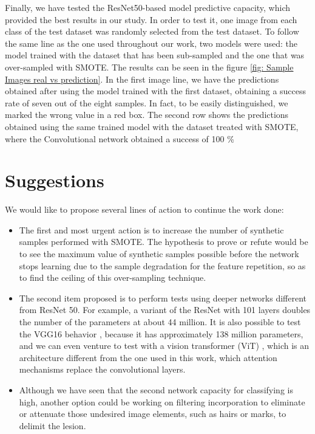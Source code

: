 Finally, we have tested the ResNet50-based model predictive capacity, which provided the best results in our study. In order to test it, one image from each class of the test dataset was randomly selected from the test dataset. To follow the same line as the one used throughout our work, two models were used: the model trained with the dataset that has been sub-sampled and the one that was over-sampled with SMOTE. The results can be seen in the figure \ref{fig: Sample Images real vs prediction}. In the first image line, we have the predictions obtained after using the model trained with the first dataset, obtaining a success rate of seven out of the eight samples. In fact, to be easily distinguished, we marked the wrong value in a red box. The second row shows the predictions obtained using the same trained model with the dataset treated with SMOTE, where the Convolutional network obtained a success of 100 \%

\section{Suggestions}

We would like to propose several lines of action to continue the work done:
\begin{itemize}
    \item The first and most urgent action is to increase the number of synthetic samples performed with SMOTE. The hypothesis to prove or refute would be to see the maximum value of synthetic samples possible before the network stops learning due to the sample degradation for the feature repetition, so as to find the ceiling of this over-sampling technique.
    \item The second item proposed is to perform tests using deeper networks different from ResNet 50. For example, a variant of the ResNet with 101 layers \cite{noauthor_resnet101_nodate} doubles the number of the parameters at about 44 million. It is also possible to test the VGG16 behavior \cite{simonyan_very_2015}, because it has approximately 138 million parameters, and we can even venture to test with a vision transformer (ViT) \cite{noauthor_papers_nodate}, which is an architecture different from the one used in this work, which attention mechanisms replace the convolutional layers. 
    \item Although we have seen that the second network capacity for classifying is high, another option could be working on filtering incorporation to eliminate or attenuate those undesired image elements, such as hairs or marks, to delimit the lesion.  
\end{itemize}



